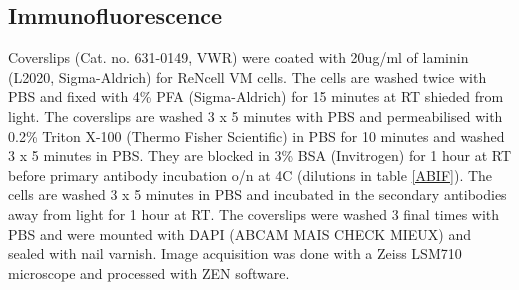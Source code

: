 \documentclass[onecolumn,10pt]{asme2ej}
\begin{document}

\subsection{Immunofluorescence}
Coverslips (Cat. no. 631-0149, VWR) were coated with 20ug/ml of laminin (L2020, Sigma-Aldrich) for ReNcell VM cells. The cells are washed twice with PBS and fixed with 4\% PFA (Sigma-Aldrich) for 15 minutes at RT shieded from light. The coverslips are washed 3 x 5 minutes with PBS and permeabilised with 0.2\% Triton X-100 (Thermo Fisher Scientific) in PBS for 10 minutes and washed 3 x 5 minutes in PBS. They are blocked in 3\% BSA (Invitrogen) for 1 hour at RT before primary antibody incubation o/n at 4C (dilutions in table \ref{ABIF}). The cells are washed 3 x 5 minutes in PBS and incubated in the secondary antibodies away from light for 1 hour at RT. The coverslips were washed 3 final times with PBS and were mounted with DAPI (ABCAM MAIS CHECK MIEUX) and sealed with nail varnish.
Image acquisition was done with a Zeiss LSM710 microscope and processed with ZEN software.

%
%
%
%
%
%
%
%


%
%
%
%
%
%
%
%
%
\end{document}
